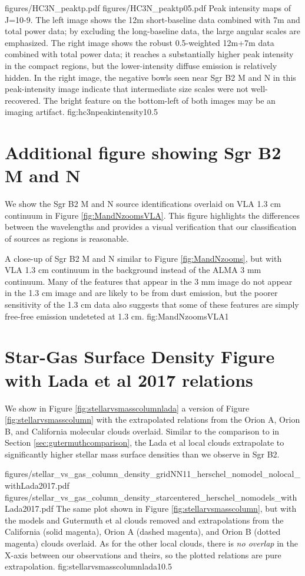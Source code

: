 \documentclass[twocolumn]{aastex61}
\begin{document}
\FigureTwo
{figures/HC3N_peaktp.pdf}
{figures/HC3N_peaktp05.pdf}
{Peak intensity maps of \cyanoacetylene J=10-9.
The left image shows the 12m short-baseline data combined with 7m and total
power data; by excluding the long-baseline data, the large angular scales are
emphasized.  The right image shows the robust 0.5-weighted 12m+7m data combined
with total power data;
it reaches a substantially higher peak intensity in the compact regions, but
the lower-intensity diffuse emission is relatively hidden.  In the right image,
the negative bowls seen near Sgr B2 M and N in this peak-intensity image
indicate that intermediate size scales were not well-recovered.  The bright
feature on the bottom-left of both images may be an imaging artifact.}
{fig:hc3npeakintensity}{1}{0.5\textwidth}

\section{Additional figure showing Sgr B2 M and N}
\label{sec:onept3cm}
We show the Sgr B2 M and N source identifications overlaid on VLA 1.3 cm
continuum \citep{De-Pree2014a} in Figure \ref{fig:MandNzoomsVLA}.  This figure
highlights the differences between the wavelengths and provides a visual
verification that our classification of sources as \hii regions is reasonable.

{A close-up of Sgr B2 M and N similar to Figure \ref{fig:MandNzooms}, but with
VLA 1.3 cm continuum \citep{De-Pree2014a} in the background instead of the ALMA 3 mm
continuum.  Many of the features that appear in the 3 mm image do not appear
in the 1.3 cm image and are likely to be from dust emission, but the poorer sensitivity
of the 1.3 cm data also suggests that some of these features are simply 
free-free emission undeteted at 1.3 cm.}
{fig:MandNzoomsVLA}{1}{\textwidth}

\section{Star-Gas Surface Density Figure with Lada et al 2017 relations}
\label{sec:ladasurfdensappendix}
We show in Figure \ref{fig:stellarvsmasscolumnlada} a version of Figure
\ref{fig:stellarvsmasscolumn} with the extrapolated relations from the Orion A,
Orion B, and California molecular clouds overlaid.  Similar to the comparison
to \citet{Gutermuth2011a} in Section \ref{sec:gutermuthcomparison}, the Lada et
al local clouds extrapolate to significantly higher stellar mass surface
densities than we observe in Sgr B2.

\FigureTwo
{figures/stellar_vs_gas_column_density_gridNN11_herschel_nomodel_nolocal_withLada2017.pdf}
{figures/stellar_vs_gas_column_density_starcentered_herschel_nomodels_withLada2017.pdf}
{The same plot shown in Figure \ref{fig:stellarvsmasscolumn},
but with the models and Gutermuth et al clouds removed and extrapolations
from the California (solid magenta), Orion A (dashed magenta), and Orion B
(dotted magenta) clouds overlaid.  As for the other local clouds, there is
\emph{no overlap} in the X-axis between our observations and theirs, so the
plotted relations are pure extrapolation.}
{fig:stellarvsmasscolumnlada}{1}{0.5\textwidth}
\end{document}
